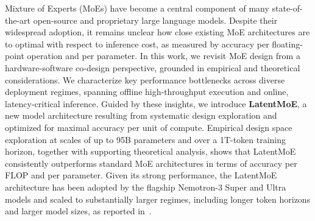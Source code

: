 Mixture of Experts (MoEs) have become a central component of many state-of-the-art open-source and proprietary large language models.
Despite their widespread adoption, it remains unclear how close existing MoE architectures are to optimal with respect to inference cost, as measured by accuracy per floating-point operation and per parameter. In this work, we revisit MoE design from a hardware-software co-design perspective, grounded in empirical and theoretical considerations. We characterize key performance bottlenecks across diverse deployment regimes, spanning offline high-throughput execution and online, latency-critical inference. Guided by these insights, we introduce \textbf{LatentMoE}, a new model architecture resulting from systematic design exploration and optimized for maximal accuracy per unit of compute. Empirical design space exploration at scales of up to 95B parameters and over a 1T-token training horizon, together with supporting theoretical analysis, shows that LatentMoE consistently outperforms standard MoE architectures in terms of accuracy per FLOP and per parameter. Given its strong performance, the LatentMoE architecture has been adopted by the flagship Nemotron-3 Super and Ultra models and scaled to substantially larger regimes, including longer token horizons and larger model sizes, as reported in~\cite{nvidia2025nvidianemotron3efficient}.
